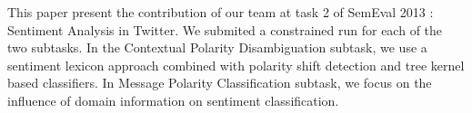 This paper present the contribution of our team at task 2 of SemEval 2013 : Sentiment Analysis in Twitter. We submited a constrained run for each of the
 two  subtasks. In the Contextual Polarity Disambiguation subtask, we use a
 sentiment lexicon approach combined with polarity shift detection and tree
 kernel based classifiers. In Message Polarity Classification subtask, we focus
 on the influence of domain information on sentiment classification.

